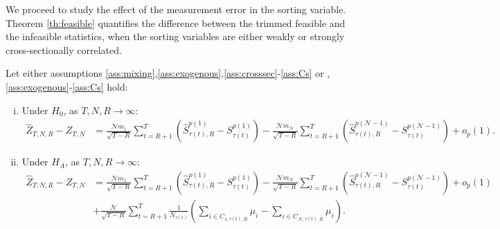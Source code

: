 We proceed to study the effect of the measurement error in the sorting variable. Theorem \ref{th:feasible} quantifies the difference between the trimmed feasible and the infeasible statistics, when the sorting variables are either weakly or strongly cross-sectionally correlated.

\begin{theorem}
\label{th:feasible} Let either assumptions \ref{ass:mixing},\ref{ass:exogenous},\ref{ass:crosssec}-\ref{ass:Cs} or , \ref{ass:exogenous}-\ref{ass:Cs} hold:

\begin{enumerate}[(i)]
\item Under $H_{0}$, as $T,N,R\rightarrow \infty$:
\begin{align*}
	\widehat{Z}_{T,N,R}-Z_{T,N} &= \frac{\mathcal{N} m_{1}}{\sqrt{T-R}}\sum_{t=R+1}^{T} \left( \widehat{S}_{\tau(t),R}^{p(1)}-S_{\tau(t) }^{p(1)}\right) -\frac{\mathcal{N} m_{\mathcal{N}}}{\sqrt{T-R}}\sum_{t=R+1}^{T} \left(\widehat{S}_{\tau(t),R}^{p(\mathcal{N}-1)}-S_{\tau(t) }^{p(\mathcal{N}-1)}\right) +o_{p}(1).
\end{align*}

\item Under $H_{A}$, as $T,N,R\rightarrow \infty$:
\begin{align*}
	\widehat{Z}_{T,N,R}-Z_{T,N} &= \frac{\mathcal{N} m_{1}}{\sqrt{T-R}}\sum_{t=R+1}^{T} \left( \widehat{S}_{\tau(t),R}^{p(1)}-S_{\tau(t) }^{p(1)}\right) -\frac{\mathcal{N} m_{\mathcal{N}}}{\sqrt{T-R}}\sum_{t=R+1}^{T} \left(\widehat{S}_{\tau(t),R}^{p(\mathcal{N}-1)}-S_{\tau(t) }^{p(\mathcal{N}-1)}\right) +o_{p}(1) \\
	&+ \frac{\mathcal{N}}{\sqrt{T-R}}\sum_{t=R+1}^{T}\frac{1}{N_{\tau(t)}} \left(\sum_{i \in C_{1,\tau(t),R}}  \mu_i - \sum_{i \in C_{\mathcal{N},\tau(t),R}} \mu_i \right).
\end{align*}
\end{enumerate}
\end{theorem}

